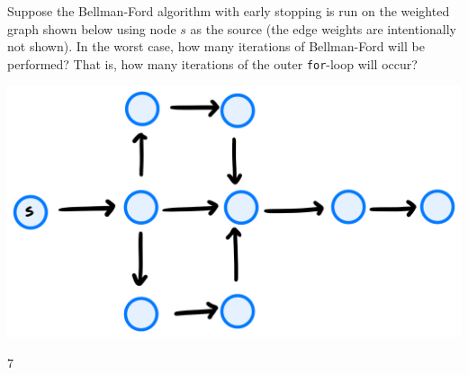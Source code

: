 \begin{prob}
    Suppose the Bellman-Ford algorithm with early stopping is run on the
    weighted graph shown below using node $s$ as the source (the edge weights are
    intentionally not shown). In the worst case, how many iterations of Bellman-Ford will
    be performed? That is, how many iterations of the outer \texttt{for}-loop will
    occur?

    \includegraphics[width=.6\textwidth]{./g6.png}

    \begin{soln}
        7
    \end{soln}

\end{prob}
